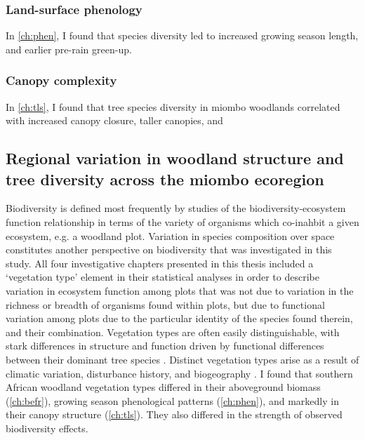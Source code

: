 \begin{refsection}
\subsubsection{Land-surface phenology}

In \autoref{ch:phen}, I found that species diversity led to increased growing season length, and earlier pre-rain green-up. 

\subsubsection{Canopy complexity}

In \autoref{ch:tls}, I found that tree species diversity in miombo woodlands correlated with increased canopy closure, taller canopies, and 


\subsection{Regional variation in woodland structure and tree diversity across the miombo ecoregion}

Biodiversity is defined most frequently by studies of the biodiversity-ecosystem function relationship in terms of the variety of organisms which co-inahbit a given ecosystem, e.g. a woodland plot. Variation in species composition over space constitutes another perspective on biodiversity that was investigated in this study. All four investigative chapters presented in this thesis included a `vegetation type' element in their statistical analyses in order to describe variation in ecosystem function among plots that was not due to variation in the richness or breadth of organisms found within plots, but due to functional variation among plots due to the particular identity of the species found therein, and their combination. Vegetation types are often easily distinguishable, with stark differences in structure and function driven by functional differences between their dominant tree species \citep{Solbrig1996}. Distinct vegetation types arise as a result of climatic variation, disturbance history, and biogeography \citep{}. I found that southern African woodland vegetation types differed in their aboveground biomass (\autoref{ch:befr}), growing season phenological patterns (\autoref{ch:phen}), and markedly in their canopy structure (\autoref{ch:tls}). They also differed in the strength of observed biodiversity effects. 


\end{refsection}
